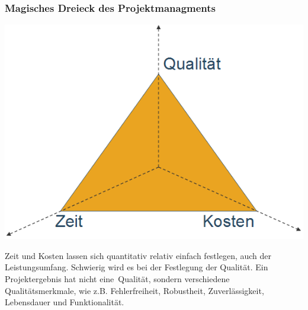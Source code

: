 \subsubsection{Magisches Dreieck des Projektmanagments}

\includegraphics[scale=0.4]{1jahr_pictures/lf02-pic/lf02-projekt-dreieck.png}

Zeit und Kosten lassen sich quantitativ relativ einfach festlegen, auch der Leistungsumfang. Schwierig wird es bei der Festlegung der Qualität. Ein Projektergebnis hat nicht \ql eine\qr\ Qualität, sondern verschiedene Qualitätsmerkmale, wie z.B. Fehlerfreiheit, Robustheit, Zuverlässigkeit, Lebensdauer und Funktionalität.


